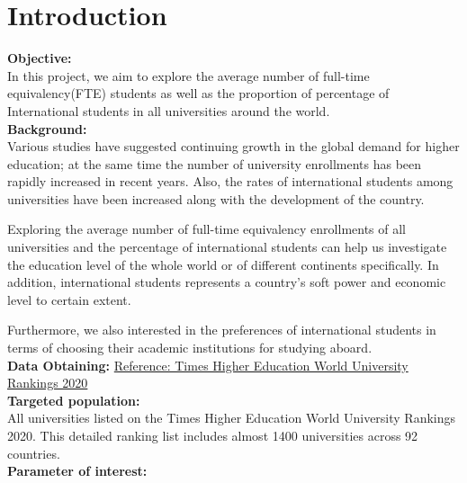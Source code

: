 \documentclass{article}
\begin{document}
\maketitle
\newpage
\section{Introduction}
\textbf{Objective:} \\

In this project, we aim to explore the average number of full-time equivalency(FTE) students as well as the proportion of percentage of International students in all universities around the world. \\

\noindent\textbf{Background:} \\

Various studies have suggested continuing growth in the global demand for higher education; at the same time the number of university enrollments has been rapidly increased in recent years. Also, the rates of international students among universities have been increased along with the development of the country. 

Exploring the average number of full-time equivalency enrollments of all universities and the percentage of international students can help us investigate the education level of the whole world or of different continents specifically. In addition, international students represents a country’s soft power and economic level to certain extent. 

Furthermore, we also interested in the preferences of international students in terms of choosing their academic institutions for studying aboard. \\

\noindent\textbf {Data Obtaining:} 
\href{https://www.timeshighereducation.com/world-university-rankings/2020/world-ranking#!/page/0/length/25/sort_by/rank/sort_order/asc/cols/stats}{Reference: Times Higher Education World University Rankings 2020} \\

\noindent\textbf {Targeted population:} \\

All universities listed on the Times Higher Education World University Rankings 2020. This detailed ranking list includes almost 1400 universities across 92 countries.  \\

\noindent\textbf {Parameter of interest:} \\
\end{document}

